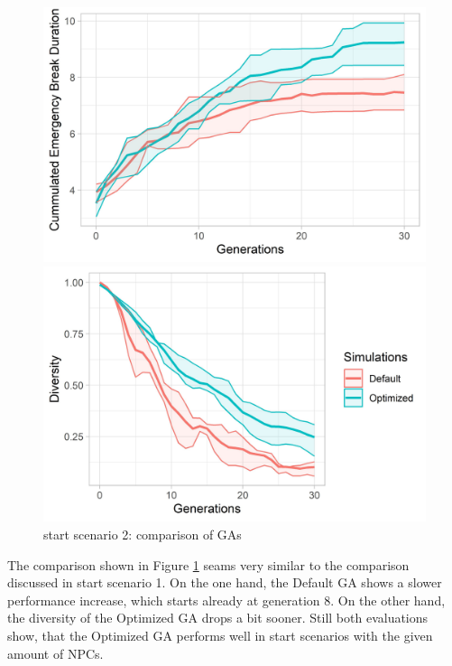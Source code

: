\begin{figure}[ht] 
	\begin{minipage}[b]{0.5\linewidth}
		\centering
		\includegraphics[width=1\linewidth]{simulations/evaluation/plots/sim_2_ga_generations} 
	\end{minipage}%
	\begin{minipage}[b]{0.5\linewidth}
		\centering
		\includegraphics[width=1\linewidth]{simulations/evaluation/plots/sim_2_ga_diversity} 
	\end{minipage} 
	\caption{start scenario 2: comparison of GAs}
	\label{fig:evaluation:sim_2_ga_comparison}
\end{figure}

The comparison shown in Figure \ref{fig:evaluation:sim_2_ga_comparison} seams very similar to the comparison discussed in start scenario 1. On the one hand, the Default GA shows a slower performance increase, which starts already at generation 8. On the other hand, the diversity of the Optimized GA drops a bit sooner. Still both evaluations show, that the Optimized GA performs well in start scenarios with the given amount of NPCs.

